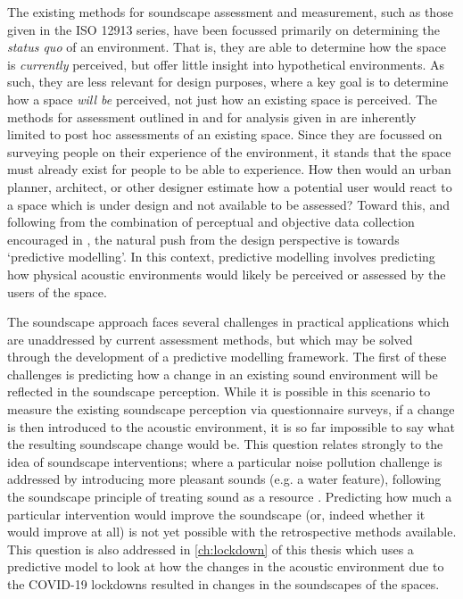The existing methods for soundscape assessment and measurement, such as those given in the ISO 12913 series, have been focussed primarily on determining the \emph{status quo} of an environment. That is, they are able to determine how the space is \emph{currently} perceived, but offer little insight into hypothetical environments. As such, they are less relevant for design purposes, where a key goal is to determine how a space \emph{will be} perceived, not just how an existing space is perceived. The methods for assessment outlined in \citet{ISO12913Part2} and for analysis given in \citet{ISO12913Part3} are inherently limited to post hoc assessments of an existing space. Since they are focussed on surveying people on their experience of the environment, it stands that the space must already exist for people to be able to experience. How then would an urban planner, architect, or other designer estimate how a potential user would react to a space which is under design and not available to be assessed? Toward this, and following from the combination of perceptual and objective data collection encouraged in \citet{ISO12913Part2}, the natural push from the design perspective is towards `predictive modelling'. In this context, predictive modelling involves predicting how physical acoustic environments would likely be perceived or assessed by the users of the space. 

The soundscape approach faces several challenges in practical applications which are unaddressed by current assessment methods, but which may be solved through the development of a predictive modelling framework. The first of these challenges is predicting how a change in an existing sound environment will be reflected in the soundscape perception. While it is possible in this scenario to measure the existing soundscape perception via questionnaire surveys, if a change is then introduced to the acoustic environment, it is so far impossible to say what the resulting soundscape change would be. This question relates strongly to the idea of soundscape interventions; where a particular noise pollution challenge is addressed by introducing more pleasant sounds (e.g. a water feature), following the soundscape principle of treating sound as a resource \citep{Lavia2016Soundscape}. Predicting how much a particular intervention would improve the soundscape (or, indeed whether it would improve at all) is not yet possible with the retrospective methods available. This question is also addressed in \cref{ch:lockdown} of this thesis which uses a predictive model to look at how the changes in the acoustic environment due to the COVID-19 lockdowns resulted in changes in the soundscapes of the spaces.

